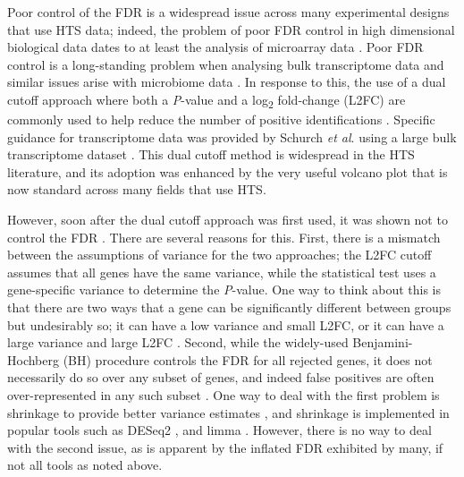 \documentclass{article}
\begin{document}
Poor control of the FDR is a widespread issue across many experimental designs that use HTS data; indeed, the problem of poor FDR control in high dimensional biological data dates to at least the analysis of microarray data \cite{Cui:2003aa}. Poor FDR control is a long-standing problem when analysing bulk transcriptome data \cite{Soneson:2013, li_exaggerated_2022} and similar issues arise with microbiome data \cite{hawinkel2017, Nearing:2022aa}. In response to this, the use of a dual cutoff approach where both a \textit{P}-value and a log\textsubscript{2} fold-change (L2FC) are commonly used  to help reduce the number of positive identifications \cite{Cui:2003aa}. Specific guidance for transcriptome data was provided by Schurch \textit{et al}. using a large bulk transcriptome dataset \cite{schurch_how_2016}. This dual cutoff method is widespread in the HTS literature, and its adoption was enhanced by the very useful volcano plot \cite{Cui:2003aa} that is now standard across many fields that use HTS.

However, soon after the dual cutoff approach was first used, it was shown not to control the FDR \cite{Zhang:2009aa}. There are several reasons for this. First, there is a mismatch between the assumptions of variance for the two approaches; the L2FC cutoff assumes that all genes have the same variance, while the statistical test uses a gene-specific variance to determine the \textit{P}-value. One way to think about this is that there are two ways that a gene can be significantly different between groups but undesirably so; it can have a low variance and small L2FC, or it can have a large variance and large L2FC \cite{ebrahimpoor_inflated_2021}. Second, while the widely-used Benjamini-Hochberg \cite{benjamini:1995} (BH) procedure controls the FDR for all rejected genes, it does not necessarily do so over any subset of genes, and indeed false positives are often over-represented in any such subset \cite{Goeman:2014aa, ebrahimpoor_inflated_2021}. One way to deal with the first problem is shrinkage to provide better variance estimates \cite{Zhang:2009aa}, and shrinkage is implemented in popular tools such as DESeq2 \cite{love_moderated_2014}, and limma \cite{ritchie_limma_2015}. However, there is no way to deal with the second issue, as is apparent by the inflated FDR exhibited by many, if not all tools as noted above.
\end{document}
